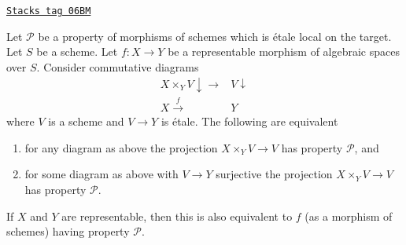 \begin{lemma}
\label{spaces-more-morphisms-lemma-representable-etale-local-target}
\href{https://stacks.math.columbia.edu/tag/06BM}{\texttt{Stacks tag 06BM}}

Let $\mathcal{P}$ be a property of morphisms of schemes which is \'etale
local on the target. Let $S$ be a scheme.
Let $f : X \to Y$ be a representable morphism of algebraic spaces over $S$.
Consider commutative diagrams
$$
\begin{array}{cc}X \times_Y V \downarrow\longrightarrow & V \downarrow \\ X \overset{f}{\longrightarrow} & Y\end{array}
$$
where $V$ is a scheme and $V \to Y$ is \'etale.
The following are equivalent
\begin{enumerate}
\item for any diagram as above the projection $X \times_Y V \to V$
has property $\mathcal{P}$, and
\item for some diagram as above with $V \to Y$ surjective
the projection $X \times_Y V \to V$ has property $\mathcal{P}$.
\end{enumerate}
If $X$ and $Y$ are representable, then this is also equivalent to
$f$ (as a morphism of schemes) having property $\mathcal{P}$.
\end{lemma}

